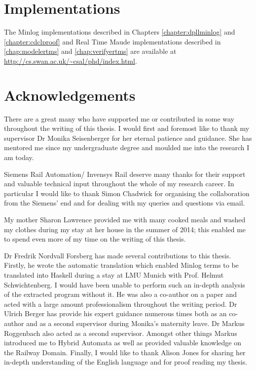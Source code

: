 \section{Implementations}
The Minlog implementations described in Chapters \ref{chapter:dpllminlog} and \ref{chapter:cdclproof} and Real Time Maude implementations described in \ref{chap:modelertms} and \ref{chap:verifyertms} are available at \url{http://cs.swan.ac.uk/~csal/phd/index.html}.

\section{Acknowledgements}
There are a great many who have supported me or contributed in some way throughout the writing of this thesis. I would first and foremost like to thank my supervisor Dr Monika Seisenberger for her eternal patience and guidance. She has mentored me since my undergraduate degree and moulded me into the research I am today. 

Siemens Rail Automation/ Invensys Rail deserve many thanks for their support and valuable technical input throughout the whole of my research career. In particular I would like to thank Simon Chadwick for organising the collaboration from the Siemens' end and for dealing with my queries and questions via email. 

My mother Sharon Lawrence provided me with many cooked meals and washed my clothes during my stay at her house in the summer of 2014; this enabled me to spend even more of my time on the writing of this thesis.

Dr Fredrik Nordvall Forsberg has made several contributions to this thesis. Firstly, he wrote the automatic translation which enabled Minlog terms to be translated into Haskell during a stay at  LMU Munich with Prof. Helmut Schwichtenberg.  I would have been unable to perform such an in-depth analysis of the extracted program without it. He was also a co-author on a paper and acted with a large amount professionalism throughout the writing period. Dr Ulrich Berger has provide his expert guidance numerous times both as an co-author and as a second supervisor during Monika's maternity leave. Dr Markus Roggenbach also acted as a second supervisor. Amongst other things Markus introduced me to Hybrid Automata as well as provided valuable knowledge on the Railway Domain. Finally, I would like to thank Alison Jones for sharing her in-depth understanding of the English language and for proof reading my thesis.


